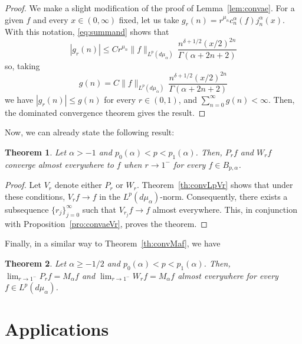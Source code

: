 \documentclass[11pt,a4paper]{amsart}
\newcommand{\ma}{M_{\alpha}}
\newcommand{\mua}{d\mu_\alpha}
\newcommand{\jna}{j_n^{\alpha}}
\newcommand{\cna}{c_n^{\alpha}}
\newcommand{\lpnorm}[3]{\|{#1}\|_{L^{#2}({#3})}} %
\theoremstyle{plain}
\newtheorem{theor}{Theorem}
\theoremstyle{remark}
\begin{document}
\begin{proof}
We make a slight modification of the proof of Lemma~\ref{lem:convae}.
For a given $f$ and every $x \in (0,\infty)$ fixed, let us take
$g_r(n) = r^{\mu_n} \cna(f)\jna(x)$.
With this notation, \eqref{eq:summand} shows that
\begin{equation}
  |g_r(n)| \leq C r^{\mu_n} \lpnorm{f}p{\mua}
  \,\frac{n^{\delta+1/2} (x/2)^{2n}}{\Gamma(\alpha+2n+2)}
\end{equation}
so, taking
\begin{equation}
  g(n) = C \lpnorm{f}p{\mua}
  \,\frac{n^{\delta+1/2} (x/2)^{2n}}{\Gamma(\alpha+2n+2)}
\end{equation}
we have $|g_r(n)| \le g(n)$ for every $r \in (0,1)$,
and $\sum_{n=0}^\infty g(n) < \infty$.
Then, the dominated convergence theorem gives the result.
\end{proof}

Now, we can already state the following result:

\begin{theor}
\label{th:convaeVr}
Let $\alpha > -1$ and $p_0(\alpha) < p < p_1(\alpha)$.
Then, $P_r f$ and $W_r f$ converge almost everywhere to $f$
when $r \to 1^-$ for every $f \in B_{p,\alpha}$.
\end{theor}

\begin{proof}
Let $V_r$ denote either $P_r$ or $W_r$. Theorem~\ref{th:convLpVr} shows that under these conditions, $V_r f \to f$ in the $L^p(\mua)$-norm. Consequently, there exists a subsequence $\{r_j\}_{j=0}^\infty$ such that $V_{r_j} f \to f$ almost everywhere. This, in conjunction with Proposition~\ref{pro:convaeVr}, proves the theorem.
\end{proof}

Finally, in a similar way to Theorem~\ref{th:convMaf}, we have

\begin{theor}
\label{th:convaeMaf}
Let $\alpha \ge -1/2$ and $p_0(\alpha) < p < p_1(\alpha)$.
Then, $\lim_{r \to 1^-} P_r f = \ma f$ and $\lim_{r \to 1^-} W_r f = \ma f$
almost everywhere for every $f \in L^p(\mua)$.
\end{theor}

\section{Applications}
\end{document}

